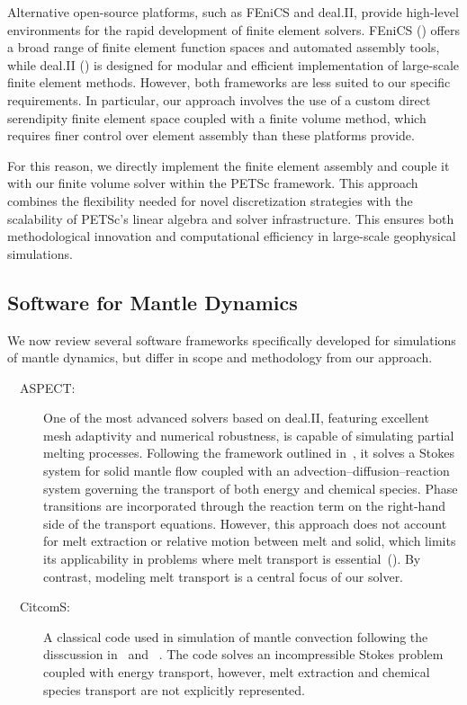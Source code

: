 \begin{description}
Alternative open-source platforms, such as FEniCS and deal.II, provide high-level environments for the rapid development of finite element solvers. 
FEniCS (\cite{BarattaEtal2023}) offers a broad range of finite element function spaces and automated assembly tools, while deal.II (\cite{dealii2019design}) is designed for modular 
and efficient implementation of large-scale finite element methods. However, both frameworks are less suited to our specific requirements. In particular, our approach involves the 
use of a custom direct serendipity finite element space coupled with a finite volume method, which requires finer control over element assembly than these platforms provide.

For this reason, we directly implement the finite element assembly and couple it with our finite volume solver within the PETSc framework. This approach combines the flexibility needed 
for novel discretization strategies with the scalability of PETSc’s linear algebra and solver infrastructure. This ensures both methodological innovation and computational efficiency in large-scale geophysical simulations.

\subsection{Software for Mantle Dynamics}
We now review several software frameworks specifically developed for simulations of mantle dynamics,
but differ in scope and methodology from our approach.

\vspace*{-6pt}\begin{description}
\item [\ \ ASPECT:] One of the most advanced solvers based on deal.II, featuring excellent mesh 
 adaptivity and numerical robustness, is capable of simulating partial 
 melting processes. Following the framework outlined 
in~\cite{SchubertTurcotteOlson2001}, it solves a Stokes system for
solid mantle flow coupled with an advection–diffusion–reaction system governing 
the transport of both energy and chemical species. Phase transitions are 
incorporated 
through the reaction term on the right-hand side of the transport equations. 
However, this approach does not account for melt extraction or relative motion 
between melt and solid, which limits its applicability in problems where melt 
					 transport is essential~(\cite{Bangerth2018}). By contrast, modeling melt transport 
is a central focus of our solver.

\item [\ \ CitcomS:]  A classical code used in
simulation of mantle convection following the disscussion in~\cite{temdepenvis} and
~\cite{geoframework}. The code solves an incompressible Stokes problem 
coupled with energy transport, however, melt extraction and chemical
species transport are not explicitly represented.


\end{description}
\end{description}
